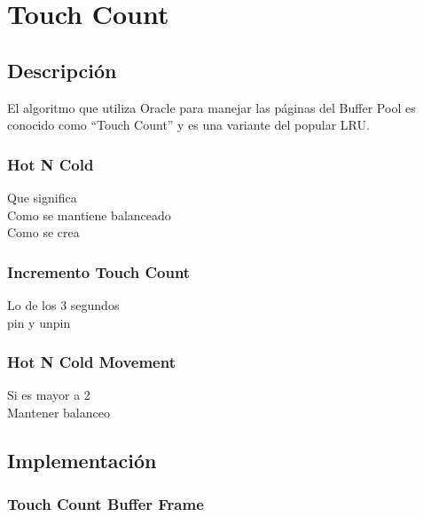 \section{Touch Count}

\subsection{Descripción}
El algoritmo que utiliza Oracle para manejar las páginas del Buffer Pool es conocido
como “Touch Count” y es una variante del popular LRU.

\subsubsection{Hot N Cold}

Que significa\\
Como se mantiene balanceado \\
Como se crea\\

\subsubsection{Incremento Touch Count}

Lo de los 3 segundos\\
pin y unpin\\

\subsubsection{Hot N Cold Movement}

Si es mayor a 2\\
Mantener balanceo\\

\subsection{Implementación}
\subsubsection{Touch Count Buffer Frame}

